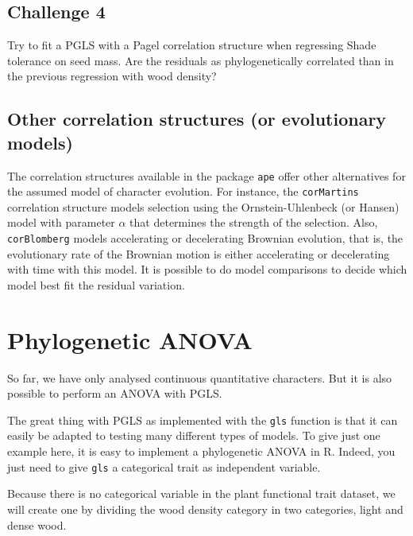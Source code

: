 \documentclass[
]{book}
\begin{document}
\hypertarget{challenge-4}{%
\section{Challenge 4}\label{challenge-4}}

Try to fit a PGLS with a Pagel correlation structure when regressing Shade tolerance on seed mass. Are the residuals as phylogenetically correlated than in the previous regression with wood density?

\hypertarget{other-correlation-structures-or-evolutionary-models}{%
\section{Other correlation structures (or evolutionary models)}\label{other-correlation-structures-or-evolutionary-models}}

The correlation structures available in the package \texttt{ape} offer other alternatives for the assumed model of character evolution. For instance, the \texttt{corMartins} correlation structure models selection using the Ornstein-Uhlenbeck (or Hansen) model with parameter \(\alpha\) that determines the strength of the selection. Also, \texttt{corBlomberg} models accelerating or decelerating Brownian evolution, that is, the evolutionary rate of the Brownian motion is either accelerating or decelerating with time with this model. It is possible to do model comparisons to decide which model best fit the residual variation.

\hypertarget{phylogenetic-anova}{%
\chapter{Phylogenetic ANOVA}\label{phylogenetic-anova}}

So far, we have only analysed continuous quantitative characters. But it is also possible to perform an ANOVA with PGLS.

The great thing with PGLS as implemented with the \texttt{gls} function is that it can easily be adapted to testing many different types of models. To give just one example here, it is easy to implement a phylogenetic ANOVA in R. Indeed, you just need to give \texttt{gls} a categorical trait as independent variable.

Because there is no categorical variable in the plant functional trait dataset, we will create one by dividing the wood density category in two categories, light and dense wood.
\end{document}
